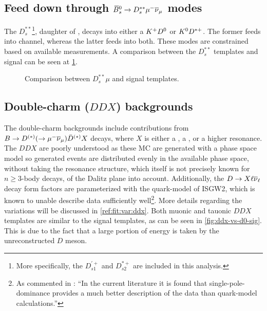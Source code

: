 \subsection{Feed down through ${{\kern 0.18em\overline{\kern -0.18em B}}{}^0_{s}} \rightarrow D_s^{**}{\mu^-}{{\overline{\nu}}_\mu}$ modes}

The $D_s^{**}$\footnote{
    More specifically, the $D_{s1}^{'+}$ and $D_{s2}^{*+}$ are included in
    this analysis.
}, daughter of \Bsb, decays into either a ${{K}^+}{{D}^0}$ or ${{K}^0}{{D}^{*+}}$.
The former feeds into \Dz channel, whereas the latter feeds into both.
These modes are constrained based on available measurements.
A comparison between the $D_s^{**}$ templates and \Dz\taum signal can be
seen at \cref{fig:d_s-vs-d0-sig}.

\begin{figure}[htb]

    \caption{Comparison between $D_s^{**}\mu$ and \Dz\taum signal templates.}
    \label{fig:d_s-vs-d0-sig}
\end{figure}


\subsection{Double-charm ($DDX$) backgrounds}
\label{ref:fit:tmpl:ddx}

The double-charm backgrounds include contributions from
$B \rightarrow D^{(*)}(\rightarrow {\ensuremath{\mu^-}}{\ensuremath{{\overline{\nu}}_\mu}})\bar{D}^{(*)} X$ decays, where $X$
is either a \kaon, a \Kstar, or a higher \Kstar resonance.
The $DDX$ are poorly understood as these MC are generated with
a phase space model so generated events are distributed evenly in the available
phase space, without taking the resonance structure,
which itself is not precisely known for $n \geq 3$-body decays,
of the Dalitz plane into account.
Additionally, the $D \rightarrow X \ell{\ensuremath{{\overline{\nu}}_\ell}}$ decay form factors are
parameterized with the quark-model of ISGW2,
which is known to unable describe data sufficiently well\footnote{
    As commented in \cite{LHCb-ANA-2020-056}:
    ``In the current literature it is found that single-pole-dominance provides
    a much better description of the data than quark-model calculations.''
}.
More details regarding the variations will be discussed in
\cref{ref:fit:var:ddx}.
Both muonic and tauonic $DDX$ templates are similar to the signal templates,
as can be seen in \cref{fig:ddx-vs-d0-sig}.
This is due to the fact that a large portion of energy is taken by the
unreconstructed $D$ meson.

